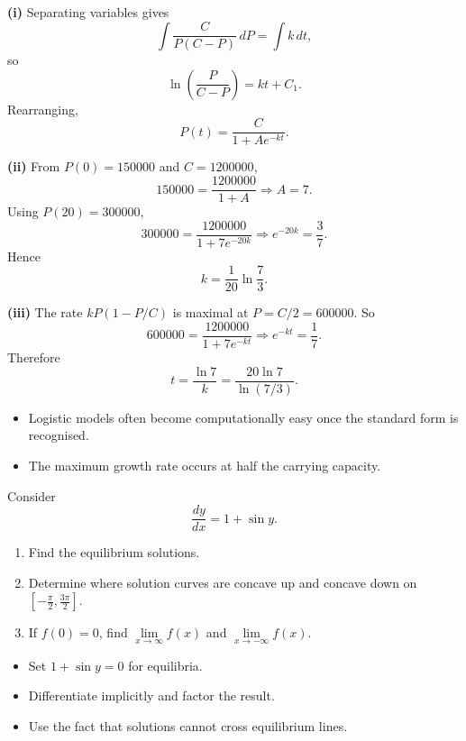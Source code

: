 \begin{solution}
\textbf{(i)} Separating variables gives
\[
\int \frac{C}{P(C-P)}\,dP=\int k\,dt,
\]
so
\[
\ln\left(\frac{P}{C-P}\right)=kt+C_1.
\]
Rearranging,
\[
\boxed{P(t)=\frac{C}{1+Ae^{-kt}}}.
\]

\textbf{(ii)} From $P(0)=150000$ and $C=1200000$,
\[
150000=\frac{1200000}{1+A}\Rightarrow A=7.
\]
Using $P(20)=300000$,
\[
300000=\frac{1200000}{1+7e^{-20k}}
\Rightarrow e^{-20k}=\frac37.
\]
Hence
\[
\boxed{k=\frac1{20}\ln\frac73}.
\]

\textbf{(iii)} The rate $kP(1-P/C)$ is maximal at $P=C/2=600000$. So
\[
600000=\frac{1200000}{1+7e^{-kt}}
\Rightarrow e^{-kt}=\frac17.
\]
Therefore
\[
\boxed{t=\frac{\ln 7}{k}=\frac{20\ln 7}{\ln(7/3)}}.
\]
\end{solution}

\begin{takeaways}
\begin{itemize}[leftmargin=*]
    \item Logistic models often become computationally easy once the standard form is recognised.
    \item The maximum growth rate occurs at half the carrying capacity.
\end{itemize}
\end{takeaways}

\begin{problem}
Consider
\[
\frac{dy}{dx}=1+\sin y.
\]
\begin{enumerate}
    \item[\textbf{i}] Find the equilibrium solutions.
    \item[\textbf{ii}] Determine where solution curves are concave up and concave down on $\left[-\frac{\pi}{2},\frac{3\pi}{2}\right]$.
    \item[\textbf{iii}] If $f(0)=0$, find $\lim\limits_{x\to\infty}f(x)$ and $\lim\limits_{x\to-\infty}f(x)$.
\end{enumerate}
\end{problem}

\begin{hint}
\begin{itemize}[leftmargin=*]
    \item Set $1+\sin y=0$ for equilibria.
    \item Differentiate implicitly and factor the result.
    \item Use the fact that solutions cannot cross equilibrium lines.
\end{itemize}
\end{hint}

